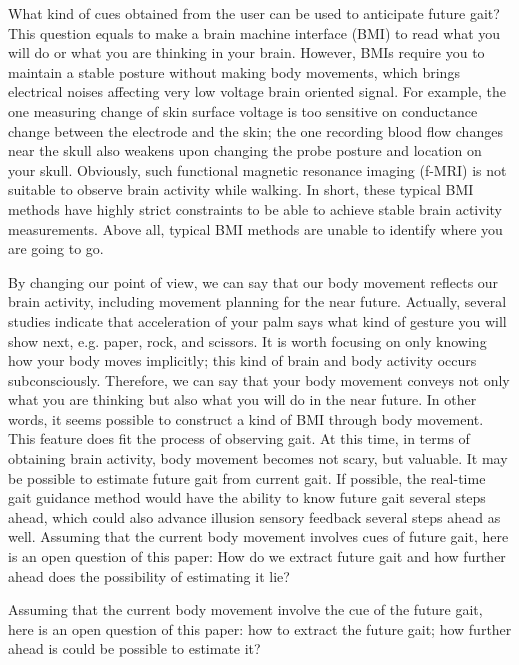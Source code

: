 \documentclass{sigchi}
\begin{document}
What kind of cues obtained from the user can be used to anticipate future gait? This question equals to make a brain machine interface (BMI) to read what you will do or what you are thinking in your brain. However, BMIs require you to maintain a stable posture without making body movements, which brings electrical noises affecting very low voltage brain oriented signal. For example, the one measuring change of skin surface voltage is too sensitive on conductance change between the electrode and the skin; the one recording blood flow changes near the skull also weakens upon changing the probe posture and location on your skull. Obviously, such functional magnetic resonance imaging (f-MRI) is not suitable to observe brain activity while walking. In short, these typical BMI methods have highly strict constraints to be able to achieve stable brain activity measurements. Above all, typical BMI methods are unable to identify  where you are going to go.

By changing our point of view, we can say that our body movement reflects our brain activity, including movement planning for the near future. Actually, several studies indicate that acceleration of your palm says what kind of gesture you will show next, e.g. paper, rock, and scissors. It is worth focusing on only knowing how your body moves implicitly; this kind of brain and body activity occurs subconsciously. Therefore, we can say that your body movement conveys not only what you are thinking but also what you will do in the near future. In other words, it seems possible to construct a kind of BMI through body movement. This feature does fit the process of observing gait. At this time, in terms of obtaining brain activity, body movement becomes not scary, but valuable. It may be possible to estimate future gait from current gait. If possible, the real-time gait guidance method would have the ability to know future gait several steps ahead, which could also advance illusion sensory feedback several steps ahead as well. 
Assuming that the current body movement involves cues of future gait, here is an open question of this paper: How do we extract future gait and how further ahead does the possibility of estimating it lie?

Assuming that the current body movement involve the cue of the future gait, here is an open question of this paper: how to extract the future gait; how further ahead is could be possible to estimate it?

\end{document}
